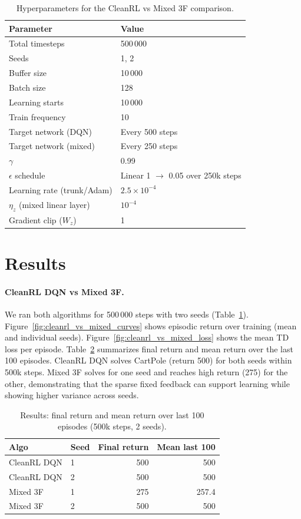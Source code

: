 \documentclass[11pt]{article}
\begin{document}
\begin{table}[ht]
\centering
\caption{Hyperparameters for the CleanRL vs Mixed 3F comparison.}
\label{tab:setup}
\begin{tabular}{ll}
\toprule
Parameter & Value \\
\midrule
Total timesteps & 500\,000 \\
Seeds & 1, 2 \\
Buffer size & 10\,000 \\
Batch size & 128 \\
Learning starts & 10\,000 \\
Train frequency & 10 \\
Target network (DQN) & Every 500 steps \\
Target network (mixed) & Every 250 steps \\
$\gamma$ & 0.99 \\
$\epsilon$ schedule & Linear 1 $\to$ 0.05 over 250k steps \\
Learning rate (trunk/Adam) & $2.5\times 10^{-4}$ \\
$\eta_z$ (mixed linear layer) & $10^{-4}$ \\
Gradient clip ($W_z$) & 1 \\
\bottomrule
\end{tabular}
\end{table}

\section{Results}

\paragraph{CleanRL DQN vs Mixed 3F.} We ran both algorithms for 500\,000 steps with two seeds (Table~\ref{tab:setup}). Figure~\ref{fig:cleanrl_vs_mixed_curves} shows episodic return over training (mean and individual seeds). Figure~\ref{fig:cleanrl_vs_mixed_loss} shows the mean TD loss per episode. Table~\ref{tab:results} summarizes final return and mean return over the last 100 episodes. CleanRL DQN solves CartPole (return 500) for both seeds within 500k steps. Mixed 3F solves for one seed and reaches high return (275) for the other, demonstrating that the sparse fixed feedback can support learning while showing higher variance across seeds.

\begin{table}[ht]
\centering
\caption{Results: final return and mean return over last 100 episodes (500k steps, 2 seeds).}
\label{tab:results}
\begin{tabular}{llrr}
\toprule
Algo & Seed & Final return & Mean last 100 \\
\midrule
CleanRL DQN & 1 & 500 & 500 \\
CleanRL DQN & 2 & 500 & 500 \\
Mixed 3F & 1 & 275 & 257.4 \\
Mixed 3F & 2 & 500 & 500 \\
\bottomrule
\end{tabular}
\end{table}
\end{document}
